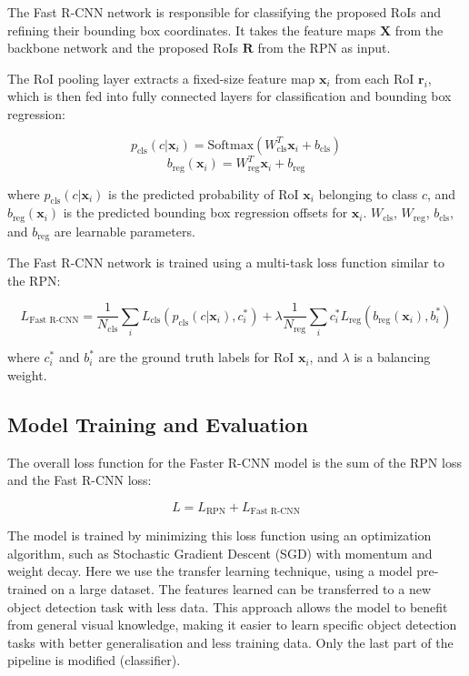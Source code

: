 \documentclass[12pt,oneside]{book} %
\begin{document}
The Fast R-CNN network is responsible for classifying the proposed RoIs and
refining their bounding box coordinates. It takes the feature maps $\mathbf{X}$
from the backbone network and the proposed RoIs $\mathbf{R}$ from the RPN as
input.

The RoI pooling layer extracts a fixed-size feature map $\mathbf{x}_i$ from
each RoI $\mathbf{r}_i$, which is then fed into fully connected layers for
classification and bounding box regression:

\begin{equation}
    p_{\text{cls}}(c | \mathbf{x}_i) = \text{Softmax}(W_{\text{cls}}^T \mathbf{x}_i + b_{\text{cls}})
\end{equation}
\begin{equation}
    b_{\text{reg}}(\mathbf{x}_i) = W_{\text{reg}}^T \mathbf{x}_i + b_{\text{reg}}
\end{equation}

where $p_{\text{cls}}(c | \mathbf{x}_i)$ is the predicted probability of RoI
$\mathbf{x}_i$ belonging to class $c$, and $b_{\text{reg}}(\mathbf{x}_i)$ is
the predicted bounding box regression offsets for $\mathbf{x}_i$.
$W_{\text{cls}}$, $W_{\text{reg}}$, $b_{\text{cls}}$, and $b_{\text{reg}}$ are
learnable parameters.

The Fast R-CNN network is trained using a multi-task loss function similar to
the RPN:

\begin{equation}
    L_{\text{Fast R-CNN}} = \frac{1}{N_{\text{cls}}} \sum_{i} L_{\text{cls}}(p_{\text{cls}}(c | \mathbf{x}_i), c_i^*) + \lambda \frac{1}{N_{\text{reg}}} \sum_{i} c_i^* L_{\text{reg}}(b_{\text{reg}}(\mathbf{x}_i), b_i^*)
\end{equation}

where $c_i^*$ and $b_i^*$ are the ground truth labels for RoI $\mathbf{x}_i$,
and $\lambda$ is a balancing weight.

\subsection{Model Training and Evaluation}

The overall loss function for the Faster R-CNN model is the sum of the RPN loss
and the Fast R-CNN loss:

\begin{equation}
    L = L_{\text{RPN}} + L_{\text{Fast R-CNN}}
\end{equation}

The model is trained by minimizing this loss function using an optimization
algorithm, such as Stochastic Gradient Descent (SGD) with momentum and weight
decay. Here we use the transfer learning technique, using a model pre-trained
on a large dataset. The features learned can be transferred to a new object
detection task with less data. This approach allows the model to benefit from
general visual knowledge, making it easier to learn specific object detection
tasks with better generalisation and less training data. Only the last part of
the pipeline is modified (classifier).
\end{document}
